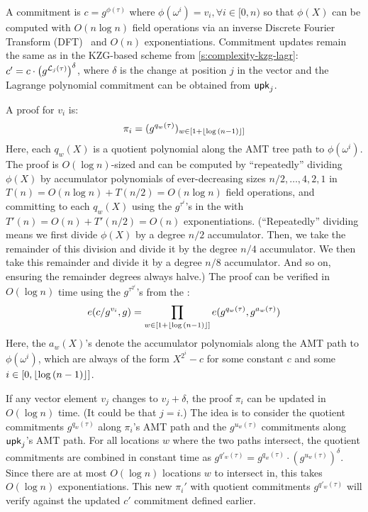 A commitment is $c=g^{\phi(\tau)}$ where $\phi(\omega^i)=v_i,\forall i\in[0,n)$ so that $\phi(X)$ can be computed with $O(n\log{n})$ field operations via an inverse Discrete Fourier Transform (DFT)~\cite[Ch 30.2]{CLRS09} and $O(n)$ exponentiations.
Commitment updates remain the same as in the KZG-based scheme from \cref{s:complexity-kzg-lagr}: $c' = c\cdot \left(g^{\mathcal{L}_j(\tau)}\right)^{\delta}$, where $\delta$ is the change at position $j$ in the vector and the Lagrange polynomial commitment can be obtained from $\mathsf{upk}_j$.

A proof for $v_i$ is:
\begin{align}
\pi_i = (g^{q_w(\tau)})_{w\in \left[1+\lfloor\log{(n-1)}\rfloor\right]}
\end{align}
Here, each $q_w(X)$ is a quotient polynomial along the AMT tree path to $\phi(\omega^i)$.
The proof is $O(\log{n})$-sized and can be computed by ``repeatedly'' dividing $\phi(X)$ by accumulator polynomials of ever-decreasing sizes $n/2, \dots, 4,2,1$ in $T(n)=O(n\log{n}) + T(n/2) = O(n\log{n})$ field operations, and committing to each $q_w(X)$ using the $g^{\tau^i}$'s in the \prk with $T'(n) = O(n) + T'(n/2)=O(n)$ exponentiations.
(``Repeatedly'' dividing means we first divide $\phi(X)$ by a degree $n/2$ accumulator. Then, we take the remainder of this division and divide it by the degree $n/4$ accumulator. We then take this remainder and divide it by a degree $n/8$ accumulator. And so on, ensuring the remainder degrees always halve.)
The proof can be verified in $O(\log{n})$ time using the $g^{\tau^{2^i}}$'s from the \vrk:
\begin{align}
e(c/g^{v_i}, g) = \prod_{w\in \left[1+\lfloor\log{(n-1)}\rfloor\right]}e(g^{q_w(\tau)}, g^{a_w(\tau)})
\end{align}
Here, the $a_w(X)$'s denote the accumulator polynomials along the AMT path to $\phi(\omega^i)$, which are always of the form $X^{2^i} - c$ for some constant $c$ and some $i\in [0,\lfloor\log{(n-1)}\rfloor]$.

If any vector element $v_j$ changes to $v_j + \delta$, the proof $\pi_i$ can be updated in $O(\log{n})$ time.
(It could be that $j=i$.)
The idea is to consider the quotient commitments $g^{q_{w}(\tau)}$ along $\pi_i$'s AMT path and the $g^{u_w(\tau)}$ commitments along $\mathsf{upk}_j$'s AMT path.
For all locations $w$ where the two paths intersect, the quotient commitments are combined in constant time as $g^{q'_w(\tau)} = g^{q_w(\tau)} \cdot \left(g^{u_w(\tau)}\right)^\delta.$
Since there are at most $O(\log{n})$ locations $w$ to intersect in, this takes $O(\log{n})$ exponentiations.
This new $\pi_i'$ with quotient commitments $g^{q'_w(\tau)}$ will verify against the updated $c'$ commitment defined earlier.

